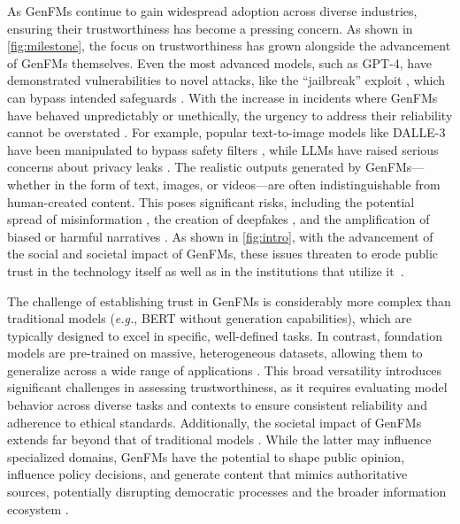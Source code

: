 As GenFMs continue to gain widespread adoption across diverse industries, ensuring their trustworthiness has become a pressing concern. As shown in \autoref{fig:milestone}, the focus on trustworthiness has grown alongside the advancement of GenFMs themselves. Even the most advanced models, such as GPT-4, have demonstrated vulnerabilities to novel attacks, like the “jailbreak” exploit \cite{wei2024jailbroken}, which can bypass intended safeguards \cite{zou2023universal}. With the increase in incidents where GenFMs have behaved unpredictably or unethically, the urgency to address their reliability cannot be overstated \cite{garcia_v_character_2024}.
For example, popular text-to-image models like DALLE-3 \cite{dalle3} have been manipulated to bypass safety filters \cite{yang2024sneakyprompt, technologyreview2023texttoimage}, while LLMs have raised serious concerns about privacy leaks \cite{huang2024position}. The realistic outputs generated by GenFMs—whether in the form of text, images, or videos—are often indistinguishable from human-created content. 
This poses significant risks, including the potential spread of misinformation \cite{huang2023harnessing}, the creation of deepfakes \cite{zhang-etal-2024-llm}, and the amplification of biased or harmful narratives \cite{ye2024justice}. 
As shown in \autoref{fig:intro}, with the advancement of the social and societal impact of GenFMs, these issues threaten to erode public trust in the technology itself as well as in the institutions that utilize it~\cite{solaiman2023evaluating}.


The challenge of establishing trust in GenFMs is considerably more complex than traditional models (\emph{e.g.}, BERT \cite{bert} without generation capabilities), which are typically designed to excel in specific, well-defined tasks. In contrast, foundation models are pre-trained on massive, heterogeneous datasets, allowing them to generalize across a wide range of applications \cite{kolides2023artificial}. This broad versatility introduces significant challenges in assessing trustworthiness, as it requires evaluating model behavior across diverse tasks and contexts to ensure consistent reliability and adherence to ethical standards. Additionally, the societal impact of GenFMs extends far beyond that of traditional models \cite{solaiman2023evaluating}. While the latter may influence specialized domains, GenFMs have the potential to shape public opinion, influence policy decisions, and generate content that mimics authoritative sources, potentially disrupting democratic processes and the broader information ecosystem \cite{bommasani2021opportunities, myers2024foundation}. 


